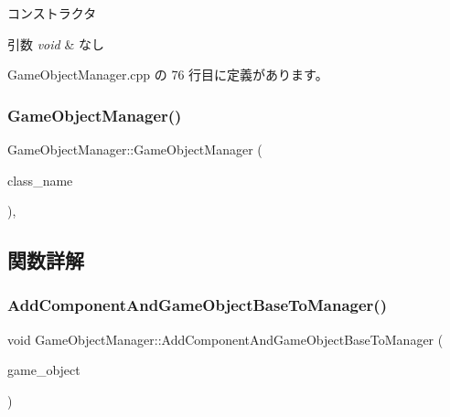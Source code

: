 コンストラクタ 


\begin{DoxyParams}{引数}
{\em void} & なし \\
\hline
\end{DoxyParams}


 Game\+Object\+Manager.\+cpp の 76 行目に定義があります。

\mbox{\label{class_game_object_manager_a51232e494925f5638d6ff83f7581ad93}} 
\subsubsection{\texorpdfstring{Game\+Object\+Manager()}{GameObjectManager()}\hspace{0.1cm}{\footnotesize\ttfamily [2/2]}}
{\footnotesize\ttfamily Game\+Object\+Manager\+::\+Game\+Object\+Manager (\begin{DoxyParamCaption}\item[{const \mbox{\hyperlink{class_game_object_manager}{Game\+Object\+Manager}} \&}]{class\+\_\+name }\end{DoxyParamCaption})\hspace{0.3cm}{\ttfamily [private]}, {\ttfamily [delete]}}



\subsection{関数詳解}
\mbox{\label{class_game_object_manager_a3263b606ab6bac222bc07c72f0493012}} 
\subsubsection{\texorpdfstring{Add\+Component\+And\+Game\+Object\+Base\+To\+Manager()}{AddComponentAndGameObjectBaseToManager()}}
{\footnotesize\ttfamily void Game\+Object\+Manager\+::\+Add\+Component\+And\+Game\+Object\+Base\+To\+Manager (\begin{DoxyParamCaption}\item[{\mbox{\hyperlink{class_game_object_base}{Game\+Object\+Base}} $\ast$}]{game\+\_\+object }\end{DoxyParamCaption})\hspace{0.3cm}{\ttfamily [private]}}



